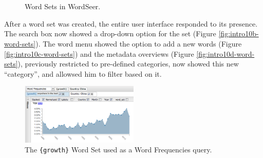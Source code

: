 \documentclass{sig-alternate}
\newcommand{\code}[1] {\texttt{#1}}
\begin{document}
\begin{figure}[ht!]
\begin{center}
%
        \\
         \\
        \quad
%
    \end{center}
    \caption{%
       Word Sets in WordSeer. \label{fig:intro10-word-sets}
     }%
\end{figure}
After a word set was created, the entire user interface responded to its presence. The search box now showed a drop-down option for the set  (Figure \ref{fig:intro10b-word-sets}).  The word menu showed the option to add a new words (Figure \ref{fig:intro10c-word-sets}) and the metadata overviews (Figure \ref{fig:intro10d-word-sets}), previously restricted to pre-defined categories,  now showed this new ``category'', and allowsed him to filter based on it.   

\begin{figure}[ht!]
\begin{center}
	\includegraphics[width=0.5\textwidth]{fig/chris/04a.png}
\end{center}
    \caption{%
	The \code{\{growth\}} Word Set used as a Word Frequencies query.\label{fig:chris04a}
     }%
\end{figure}
\end{document}
